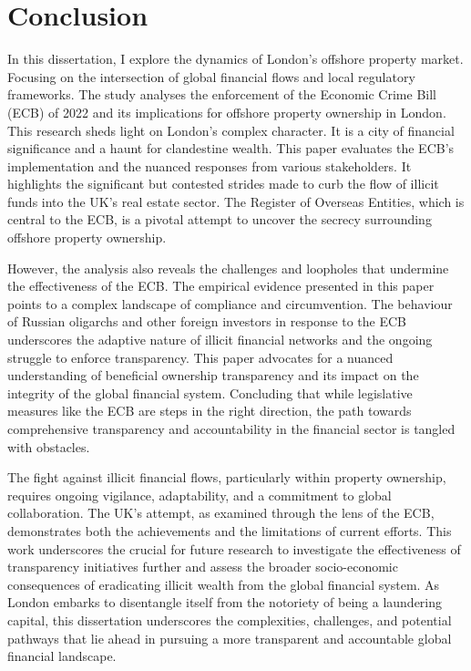 \documentclass{article}
\begin{document}
\section{Conclusion}
In this dissertation, I explore the dynamics of London's offshore property market. Focusing on the intersection of global financial flows and local regulatory frameworks. The study analyses the enforcement of the Economic Crime Bill (ECB) of 2022 and its implications for offshore property ownership in London. This research sheds light on London's complex character. It is a city of financial significance and a haunt for clandestine wealth. This paper evaluates the ECB's implementation and the nuanced responses from various stakeholders. It highlights the significant but contested strides made to curb the flow of illicit funds into the UK's real estate sector. The Register of Overseas Entities, which is central to the ECB, is a pivotal attempt to uncover the secrecy surrounding offshore property ownership.

However, the analysis also reveals the challenges and loopholes that undermine the effectiveness of the ECB. The empirical evidence presented in this paper points to a complex landscape of compliance and circumvention. The behaviour of Russian oligarchs and other foreign investors in response to the ECB underscores the adaptive nature of illicit financial networks and the ongoing struggle to enforce transparency. This paper advocates for a nuanced understanding of beneficial ownership transparency and its impact on the integrity of the global financial system. Concluding that while legislative measures like the ECB are steps in the right direction, the path towards comprehensive transparency and accountability in the financial sector is tangled with obstacles.

The fight against illicit financial flows, particularly within property ownership, requires ongoing vigilance, adaptability, and a commitment to global collaboration. The UK's attempt, as examined through the lens of the ECB, demonstrates both the achievements and the limitations of current efforts. This work underscores the crucial for future research to investigate the effectiveness of transparency initiatives further and assess the broader socio-economic consequences of eradicating illicit wealth from the global financial system. As London embarks to disentangle itself from the notoriety of being a laundering capital, this dissertation underscores the complexities, challenges, and potential pathways that lie ahead in pursuing a more transparent and accountable global financial landscape.
\newpage
\end{document}
